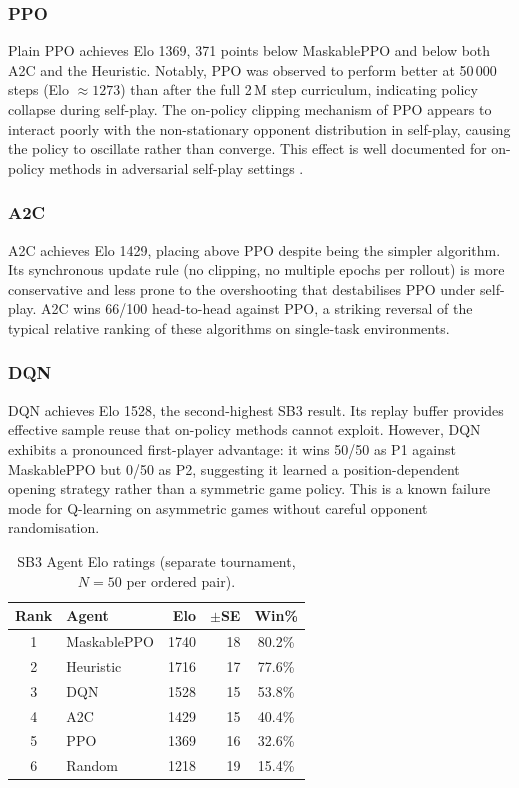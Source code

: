 \documentclass[conference]{IEEEtran}
\begin{document}
\subsubsection{PPO}
Plain PPO achieves Elo 1369, 371 points below MaskablePPO and below both A2C and
the Heuristic. Notably, PPO was observed to perform better at 50\,000 steps
(Elo $\approx 1273$) than after the full 2\,M step curriculum, indicating policy
collapse during self-play. The on-policy clipping mechanism of PPO appears to
interact poorly with the non-stationary opponent distribution in self-play,
causing the policy to oscillate rather than converge. This effect is well
documented for on-policy methods in adversarial self-play settings \cite{balduzzi2019}.

\subsubsection{A2C}
A2C achieves Elo 1429, placing above PPO despite being the simpler algorithm.
Its synchronous update rule (no clipping, no multiple epochs per rollout) is more
conservative and less prone to the overshooting that destabilises PPO under
self-play. A2C wins 66/100 head-to-head against PPO, a striking reversal of
the typical relative ranking of these algorithms on single-task environments.

\subsubsection{DQN}
DQN achieves Elo 1528, the second-highest SB3 result. Its replay buffer provides
effective sample reuse that on-policy methods cannot exploit. However, DQN
exhibits a pronounced first-player advantage: it wins 50/50 as P1 against
MaskablePPO but 0/50 as P2, suggesting it learned a position-dependent opening
strategy rather than a symmetric game policy. This is a known failure mode for
Q-learning on asymmetric games without careful opponent randomisation.

\begin{table}[h]
  \centering
  \caption{SB3 Agent Elo ratings (separate tournament, $N=50$ per ordered pair).}
  \label{tab:sb3_elo}
  \renewcommand{\arraystretch}{1.15}
  \begin{tabular}{clrrc}
    \toprule
    \textbf{Rank} & \textbf{Agent} & \textbf{Elo} & \textbf{$\pm$SE} & \textbf{Win\%} \\
    \midrule
    1 & MaskablePPO & 1740 & 18 & 80.2\% \\
    2 & Heuristic   & 1716 & 17 & 77.6\% \\
    3 & DQN         & 1528 & 15 & 53.8\% \\
    4 & A2C         & 1429 & 15 & 40.4\% \\
    5 & PPO         & 1369 & 16 & 32.6\% \\
    6 & Random      & 1218 & 19 & 15.4\% \\
    \bottomrule
  \end{tabular}
\end{table}
\end{document}
